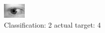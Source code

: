 \begin{figure}[h!]
\begin{center}
\includegraphics[width=0.60\columnwidth]{figures/ID776_class_2_target_4.png}
\end{center}
\caption{ Classification: 2 actual target: 4}
\label{fig:ID776_class_2_target_4}
\end{figure}

